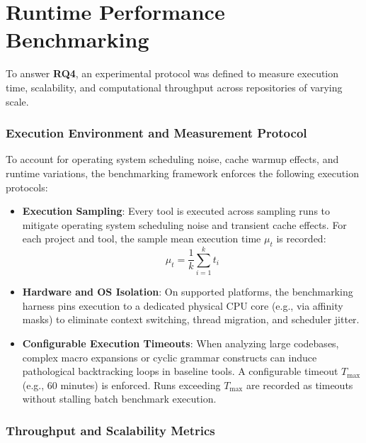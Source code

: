 \section{Runtime Performance Benchmarking}
\label{sec:performance_benchmarking}
\label{sec:benchmarking_protocol}

To answer \textbf{RQ4}, an experimental protocol was defined to
measure execution time, scalability, and computational throughput
across repositories of varying scale.

\subsubsection{Execution Environment and Measurement Protocol}
\label{subsec:execution_sampling}

To account for operating system scheduling noise, cache warmup
effects, and runtime variations, the benchmarking framework enforces
the following execution protocols:
\begin{itemize}
  \item \textbf{Execution Sampling}: Every tool is executed across
    sampling runs to mitigate operating system scheduling noise and
    transient cache effects. For each project and tool, the sample mean
    execution time $\mu_t$ is recorded:
    \begin{equation}
      \mu_t = \frac{1}{k} \sum_{i=1}^k t_i
    \end{equation}
  \item \textbf{Hardware and OS Isolation}: On supported platforms,
    the benchmarking harness pins execution to a dedicated physical
    CPU core (e.g., via affinity masks) to eliminate context
    switching, thread migration, and scheduler jitter.
  \item \textbf{Configurable Execution Timeouts}: When analyzing
    large codebases, complex macro expansions or cyclic grammar
    constructs can induce pathological backtracking loops in baseline
    tools. A configurable timeout $T_{\text{max}}$ (e.g., 60 minutes)
    is enforced. Runs exceeding $T_{\text{max}}$ are recorded as
    timeouts without stalling batch benchmark execution.
\end{itemize}

\subsubsection{Throughput and Scalability Metrics}
\label{subsec:scalability_metrics}

